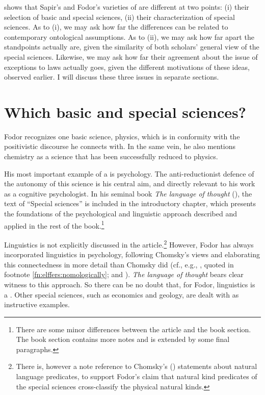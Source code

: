\documentclass[output=paper]{langscibook}
\begin{document}
 shows that Sapir's and Fodor's varieties of  are different at two points: (i) their selection of basic and special sciences, (ii) their characterization of special sciences. As to (i), we may ask how far the differences can be related to contemporary ontological assumptions. As to (ii), we may ask how far apart the standpoints actually are, given the similarity of both scholars' general view of the special sciences. Likewise, we may ask how far their agreement about the issue of exceptions to laws actually goes, given the different motivations of these ideas, observed earlier. I will discuss these three issues in separate sections.

\largerpage
\section{Which basic and special sciences?}
\label{sec:elffers:basicspecial}

Fodor recognizes one basic science, physics, which is in conformity with the positivistic discourse he connects with. In the same vein, he also mentions chemistry as a science that has been successfully reduced to physics.

His most important example of a  is psychology. The anti-reduc\-tionist defence of the autonomy of this science is his central aim, and directly relevant to his work as a cognitive psychologist. In his seminal book \emph{The language of thought} (\citeyear{Fodor1975}), the text of ``Special sciences'' is included in the introductory chapter, which presents the foundations of the psychological and linguistic approach described and applied in the rest of the book.\footnote{There are some minor differences between the article and the book section. The book section contains more notes and is extended by some final paragraphs.}

Linguistics is not explicitly discussed in the \citeyear{Fodor1974} article.\footnote{There is, however a note reference to Chomsky's (\citeyear{Chomsky1965}) statements about natural language predicates, to support Fodor's claim that natural kind predicates of the special sciences cross-classify the physical natural kinds.} However, Fodor has always incorporated linguistics in psychology, following Chomsky's views and elaborating this connectedness in more detail than Chomsky did (cf., e.g., \citealt[149]{Fodor1985}, quoted in footnote \ref{fn:elffers:nomologically}; and \citealt[278]{LoewerRey1991}). \emph{The language of thought} bears clear witness to this approach. So there can be no doubt that, for Fodor, linguistics is a . Other special sciences, such as economics and geology, are dealt with as instructive examples.
\end{document}
